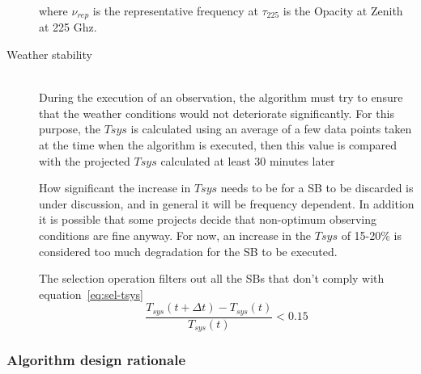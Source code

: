 \begin{description}
where $\nu_{rep}$ is the representative frequency at $\tau_{225}$ is the Opacity
at Zenith at 225 Ghz.

\item[Weather stability] \hfill \\
During the execution of an observation, the algorithm must try to ensure that the weather conditions would not deteriorate significantly.
For this purpose, the $Tsys$ is calculated using an average of a few data
points taken at the time when the algorithm is executed, then this value is compared with the
projected $Tsys$ calculated at least 30 minutes later

How significant the increase in $Tsys$ needs to be for a SB to be discarded
is under discussion, and in general it will be frequency dependent. In addition
it is possible that some projects decide that non-optimum observing conditions are
fine anyway. For now, an increase in the $Tsys$  of 15-20\% is considered too much
degradation for the SB to be executed.

The selection operation filters out all the SBs that don't comply with equation~\ref{eq:sel-tsys}
\begin{equation}
\label{eq:sel-tsys}
\frac{T_{sys}(t+\Delta t) - T_{sys}(t)}{T_{sys}(t)} < 0.15
\end{equation}

\end{description}

\subsubsection{Algorithm design rationale}

